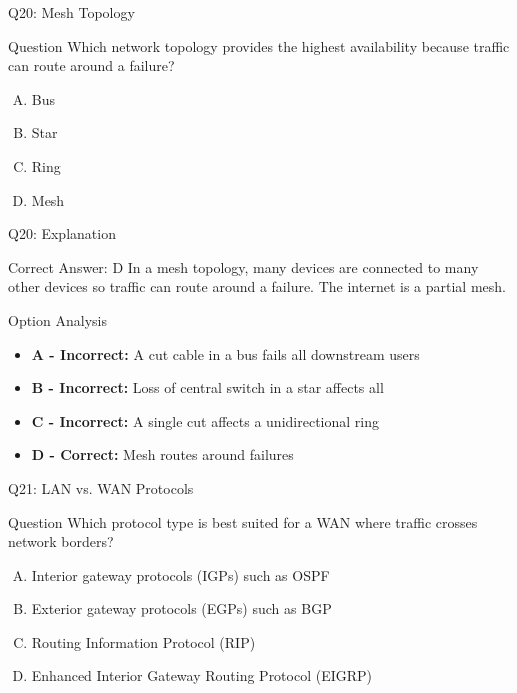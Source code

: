 \documentclass{beamer}
\begin{document}
	\begin{frame}{Q20: Mesh Topology}
		\begin{block}{Question}
			Which network topology provides the highest availability because traffic can route around a failure?
		\end{block}
		\begin{enumerate}[(A)]
			\item Bus
			\item Star
			\item Ring
			\item Mesh
		\end{enumerate}
	\end{frame}
	
	\begin{frame}{Q20: Explanation}
		\begin{block}{Correct Answer: D}
			In a mesh topology, many devices are connected to many other devices so traffic can route around a failure. The internet is a partial mesh.
		\end{block}
		\begin{block}{Option Analysis}
			\begin{itemize}
				\item \textbf{A - Incorrect:} A cut cable in a bus fails all downstream users
				\item \textbf{B - Incorrect:} Loss of central switch in a star affects all
				\item \textbf{C - Incorrect:} A single cut affects a unidirectional ring
				\item \textbf{D - Correct:} Mesh routes around failures
			\end{itemize}
		\end{block}
	\end{frame}
	
	\begin{frame}{Q21: LAN vs. WAN Protocols}
		\begin{block}{Question}
			Which protocol type is best suited for a WAN where traffic crosses network borders?
		\end{block}
		\begin{enumerate}[(A)]
			\item Interior gateway protocols (IGPs) such as OSPF
			\item Exterior gateway protocols (EGPs) such as BGP
			\item Routing Information Protocol (RIP)
			\item Enhanced Interior Gateway Routing Protocol (EIGRP)
		\end{enumerate}
	\end{frame}
	
\end{document}
